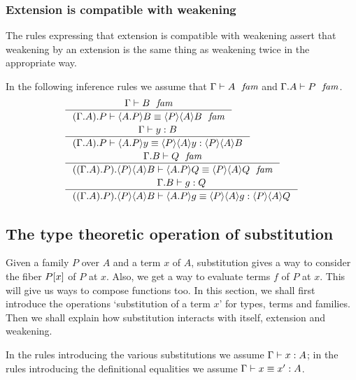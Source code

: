 \subsubsection{Extension is compatible with weakening}\label{comp-ew}
The rules expressing that extension is compatible with weakening assert that
weakening by an extension is the same thing as weakening twice in the
appropriate way.

In the following inference rules we assume that
$\jfam{\Gamma}{A}$ and $\jfam{\ctxext{\Gamma}{A}}{P}$. 
\begin{align}
& \inference{\jfam{\Gamma}{B}}
    {\jfameq{\ctxext{{\Gamma}{A}}{P}}{\ctxwk{\ctxext{A}{P}}{B}}{\ctxwk{P}{{A}{B}}}}\\
& \inference{\jterm{\Gamma}{B}{y}}
    {\jtermeq{\ctxext{{\Gamma}{A}}{P}}{\ctxwk{P}{{A}{B}}}{\ctxwk{\ctxext{A}{P}}{y}}{\ctxwk{P}{{A}{y}}}}\\
& \inference{\jfam{\ctxext{\Gamma}{B}}{Q}}
    {\jfameq{\ctxext{{{\Gamma}{A}}{P}}{\ctxwk{P}{{A}{B}}}}{\ctxwk{\ctxext{A}{P}}{Q}}{\ctxwk{P}{{A}{Q}}}}\\
& \inference{\jterm{\ctxext{\Gamma}{B}}{Q}{g}}
    {\jtermeq{\ctxext{{{\Gamma}{A}}{P}}{\ctxwk{P}{{A}{B}}}}{\ctxwk{P}{{A}{Q}}}{\ctxwk{\ctxext{A}{P}}{g}}{\ctxwk{P}{{A}{g}}}}
\end{align}

\subsection{The type theoretic operation of substitution}
Given a family $P$ over $A$ and a term $x$ of $A$, substitution gives a way to
consider the fiber $\subst{x}{P}$ of $P$ at $x$. Also, we get a way to evaluate
terms $f$ of $P$ at $x$. This will give us ways to compose functions too. In
this section, we shall first introduce the operations `substitution of a term $x$'
for types, terms and families. Then we shall explain how substitution interacts
with itself, extension and weakening.

In the rules introducing the various substitutions we assume $\jterm{\Gamma}{A}{x}$;
in the rules introducing the definitional equalities we assume $\jtermeq{\Gamma}{A}{x}{x'}$.

